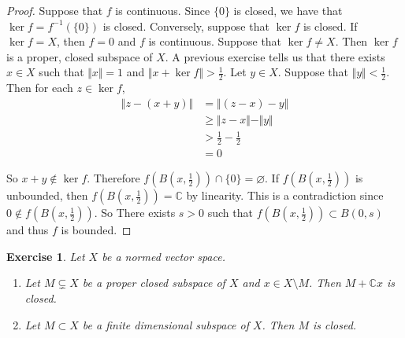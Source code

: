 \documentclass[12pt]{amsart}
\newtheorem{ex}[thm]{Exercise}
\newcommand{\C}{\mathbb{C}}
\newcommand{\n}{\Vert}
\begin{document}
\begin{proof}
Suppose that $f$ is continuous. Since $\{0\}$ is closed, we have that $\ker f = f^{-1}(\{0\})$ is closed. Conversely, suppose that $\ker f$ is closed. If $\ker f = X$, then $f =0$ and $f$ is continuous. Suppose that $\ker f \neq X$. Then $\ker f$ is a proper, closed subspace of $X$. A previous exercise tells us that there exists $x \in X$ such that $\n x \n = 1$ and $\n x + \ker f \n > \frac{1}{2}$. Let $y \in X$. Suppose that $\n y \n < \frac{1}{2}$. Then for each $z \in \ker f$, 
\begin{align*}
\n z -  (x+y)\n 
& = \n (z-x) -y \n \\
& \geq \n z-x \n - \n y \n \\
& > \frac{1}{2} - \frac{1}{2} \\
&=0
\end{align*}

So $x+y \not \in \ker f$. Therefore $f(B(x,\frac{1}{2})) \cap \{0\} = \varnothing$. If $f(B(x,\frac{1}{2})) $ is unbounded, then $f(B(x,\frac{1}{2})) = \C$ by linearity. This is a contradiction since $0 \not \in f(B(x,\frac{1}{2}))$. So There exists $s > 0$ such that $f(B(x,\frac{1}{2})) \subset B(0,s)$ and thus $f$ is bounded. 
\end{proof}

\begin{ex}
Let $X$ be a normed vector space. 
\begin{enumerate}
\item Let $M \subsetneq X$ be a proper closed subspace of $X$ and $x \in X \setminus M$. Then $M + \C x$ is closed.
\item Let $M \subset X$ be a finite dimensional subspace of $X$. Then $M$ is closed.
\end{enumerate}
\end{ex}
\end{document}
